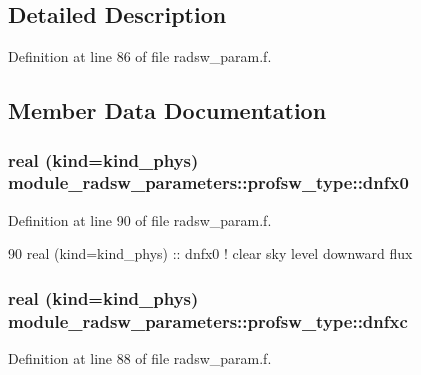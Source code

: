 \subsection{Detailed Description}


Definition at line 86 of file radsw\+\_\+param.\+f.



\subsection{Member Data Documentation}
\subsubsection[{\texorpdfstring{dnfx0}{dnfx0}}]{\setlength{\rightskip}{0pt plus 5cm}real (kind=kind\+\_\+phys) module\+\_\+radsw\+\_\+parameters\+::profsw\+\_\+type\+::dnfx0}\hypertarget{structmodule__radsw__parameters_1_1profsw__type_aff3ff3155ed05a18fa7caba351d1c503}{}\label{structmodule__radsw__parameters_1_1profsw__type_aff3ff3155ed05a18fa7caba351d1c503}


Definition at line 90 of file radsw\+\_\+param.\+f.


\begin{DoxyCode}
90         \textcolor{keywordtype}{real (kind=kind\_phys)} :: dnfx0         \textcolor{comment}{! clear sky level downward flux}
\end{DoxyCode}
\subsubsection[{\texorpdfstring{dnfxc}{dnfxc}}]{\setlength{\rightskip}{0pt plus 5cm}real (kind=kind\+\_\+phys) module\+\_\+radsw\+\_\+parameters\+::profsw\+\_\+type\+::dnfxc}\hypertarget{structmodule__radsw__parameters_1_1profsw__type_a4d253ac17ae97351a0a3eb15ab4d55e4}{}\label{structmodule__radsw__parameters_1_1profsw__type_a4d253ac17ae97351a0a3eb15ab4d55e4}


Definition at line 88 of file radsw\+\_\+param.\+f.


